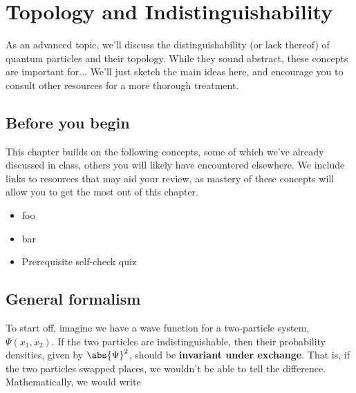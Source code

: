 %

%

\chapter[Topology]{Topology and Indistinguishability} \label{ch:topo}
As an advanced topic, we'll discuss the distinguishability (or lack thereof) of quantum particles and their topology.
While they sound abstract, these concepts are important for...
We'll just sketch the main ideas here, and encourage you to consult other resources for a more thorough treatment.



\section{Before you begin}

This chapter builds on the following concepts, some of which we've already discussed in class, others you will likely have encountered elsewhere.
We include links to resources that may aid your review, as mastery of these concepts will allow you to get the most out of this chapter.

\begin{itemize}
	\item foo 
	\item bar 
	\item Prerequisite self-check quiz 
\end{itemize}



\section{General formalism}
To start off, imagine we have a wave function for a two-particle system, $\Psi(x_1, x_2)$.
If the two particles are indistinguishable, then their probability densities, given by $\abs{\Psi}^2$, should be \textbf{invariant under exchange}.
That is, if the two particles swapped places, we wouldn't be able to tell the difference.
Mathematically, we would write

